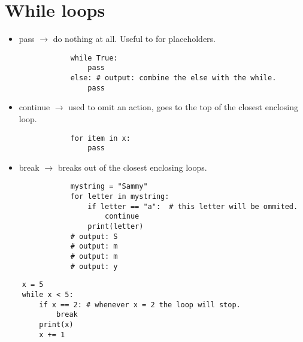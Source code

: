 \section{While loops}
\begin{itemize}
    \item pass $\rightarrow$ do nothing at all. Useful to for placeholders. 
        \begin{verbatim}
            while True: 
                pass 
            else: # output: combine the else with the while. 
                pass
        \end{verbatim}

    \item continue $\rightarrow$ used to omit an action, goes to the top of the closest enclosing loop. 
        \begin{verbatim}
            for item in x: 
                pass 
        \end{verbatim}

    \item break $\rightarrow$ breaks out of the closest enclosing loops. 
        \begin{verbatim}
            mystring = "Sammy"
            for letter in mystring: 
                if letter == "a":  # this letter will be ommited. 
                    continue 
                print(letter)
            # output: S
            # output: m
            # output: m
            # output: y
        \end{verbatim}

\end{itemize}
\begin{verbatim}
    x = 5 
    while x < 5: 
        if x == 2: # whenever x = 2 the loop will stop. 
            break 
        print(x)
        x += 1 
\end{verbatim}

